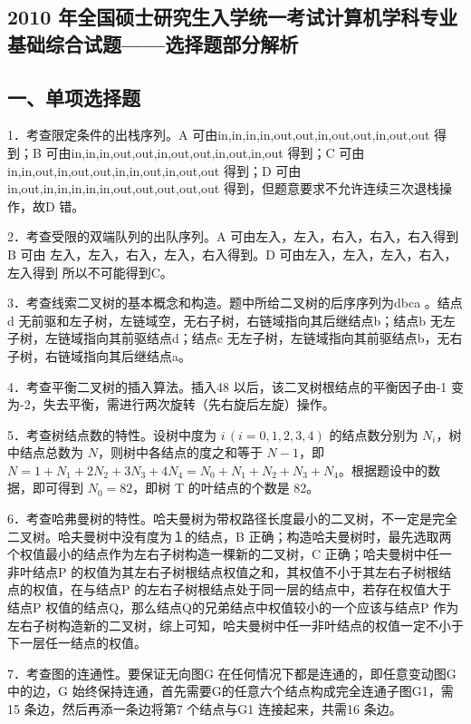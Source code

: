 \documentclass[UTF8,11pt]{ctexart}
\begin{document}
\subsection*{2010 年全国硕士研究生入学统一考试计算机学科专业基础综合试题——选择题部分解析}

\subsection*{一、单项选择题}

1．考查限定条件的出栈序列。A 可由in,in,in,in,out,out,in,out,out,in,out,out 得到；B 可由in,in,in,out,out,in,out,out,in,out,in,out 得到；C 可由in,in,out,in,out,out,in,in,out,in,out,out 得到；D 可由in,out,in,in,in,in,in,out,out,out,out,out 得到，但题意要求不允许连续三次退栈操作，故D 错。


2．考查受限的双端队列的出队序列。A 可由左入，左入，右入，右入，右入得到 B 可由 左入，左入，右入，左入，右入得到。D 可由左入，左入，左入，右入，左入得到 所以不可能得到C。


3．考查线索二叉树的基本概念和构造。题中所给二叉树的后序序列为dbca 。结点d 无前驱和左子树，左链域空，无右子树，右链域指向其后继结点b；结点b 无左子树，左链域指向其前驱结点d；结点c 无左子树，左链域指向其前驱结点b，无右子树，右链域指向其后继结点a。


4．考查平衡二叉树的插入算法。插入48 以后，该二叉树根结点的平衡因子由-1 变为-2，失去平衡，需进行两次旋转（先右旋后左旋）操作。


5．考查树结点数的特性。设树中度为 \(\displaystyle i\,(i=0,\allowbreak 1,\allowbreak 2,\allowbreak 3,\allowbreak 4)\) 的结点数分别为 \(\displaystyle N_i\)，树中结点总数为 \(\displaystyle N\)，则树中各结点的度之和等于 \(\displaystyle N-1\)，即 \(\displaystyle N=1+N_1+2N_2+3N_3+4N_4=N_0+N_1+N_2+N_3+N_4\)。根据题设中的数据，即可得到 \(\displaystyle N_0=82\)，即树 T 的叶结点的个数是 82。


6．考查哈弗曼树的特性。哈夫曼树为带权路径长度最小的二叉树，不一定是完全二叉树。哈夫曼树中没有度为１的结点，B 正确；构造哈夫曼树时，最先选取两个权值最小的结点作为左右子树构造一棵新的二叉树，C 正确；哈夫曼树中任一非叶结点P 的权值为其左右子树根结点权值之和，其权值不小于其左右子树根结点的权值，在与结点P 的左右子树根结点处于同一层的结点中，若存在权值大于结点P 权值的结点Q，那么结点Q的兄弟结点中权值较小的一个应该与结点P 作为左右子树构造新的二叉树，综上可知，哈夫曼树中任一非叶结点的权值一定不小于下一层任一结点的权值。


7．考查图的连通性。要保证无向图G 在任何情况下都是连通的，即任意变动图G 中的边，G 始终保持连通，首先需要G的任意六个结点构成完全连通子图G1，需15 条边，然后再添一条边将第7 个结点与G1 连接起来，共需16 条边。
\end{document}
